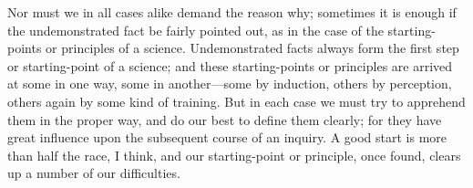 Nor must we in all cases alike demand the reason why; sometimes it is
enough if the undemonstrated fact be fairly pointed out, as in the
case of the starting-points or principles of a science. Undemonstrated
facts always form the first step or starting-point of a science; and
these starting-points or principles are arrived at some in one way,
some in another---some by induction, others by perception, others
again by some kind of training. But in each case we must try to
apprehend them in the proper way, and do our best to define them
clearly; for they have great influence upon the subsequent course of
an inquiry. A good start is more than half the race, I think, and our
starting-point or principle, once found, clears up a number of our
difficulties.

